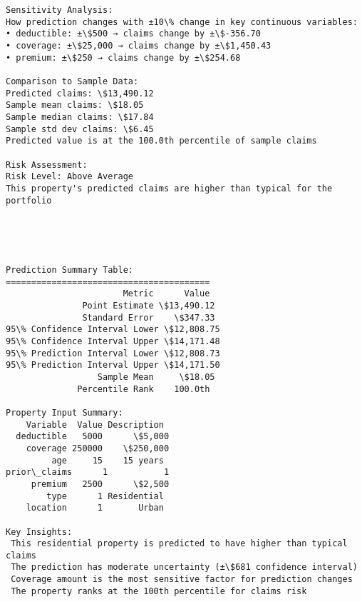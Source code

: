 \documentclass[8pt, twocolumn]{extarticle}
\begin{document}
\begin{Verbatim}[commandchars=\\\{\}]
Sensitivity Analysis:
How prediction changes with ±10\% change in key continuous variables:
• deductible: ±\$500 → claims change by ±\$-356.70
• coverage: ±\$25,000 → claims change by ±\$1,450.43
• premium: ±\$250 → claims change by ±\$254.68

Comparison to Sample Data:
Predicted claims: \$13,490.12
Sample mean claims: \$18.05
Sample median claims: \$17.84
Sample std dev claims: \$6.45
Predicted value is at the 100.0th percentile of sample claims

Risk Assessment:
Risk Level: Above Average
This property's predicted claims are higher than typical for the portfolio
    \end{Verbatim}

    \begin{center}
    \end{center}
    { \hspace*{\fill} \\}
    
    \begin{Verbatim}[commandchars=\\\{\}]


Prediction Summary Table:
========================================
                       Metric      Value
               Point Estimate \$13,490.12
               Standard Error    \$347.33
95\% Confidence Interval Lower \$12,808.75
95\% Confidence Interval Upper \$14,171.48
95\% Prediction Interval Lower \$12,808.73
95\% Prediction Interval Upper \$14,171.50
                  Sample Mean     \$18.05
              Percentile Rank    100.0th

Property Input Summary:
    Variable  Value Description
  deductible   5000      \$5,000
    coverage 250000    \$250,000
         age     15    15 years
prior\_claims      1           1
     premium   2500      \$2,500
        type      1 Residential
    location      1       Urban

Key Insights:
 This residential property is predicted to have higher than typical claims
 The prediction has moderate uncertainty (±\$681 confidence interval)
 Coverage amount is the most sensitive factor for prediction changes
 The property ranks at the 100th percentile for claims risk
    \end{Verbatim}
\end{document}
